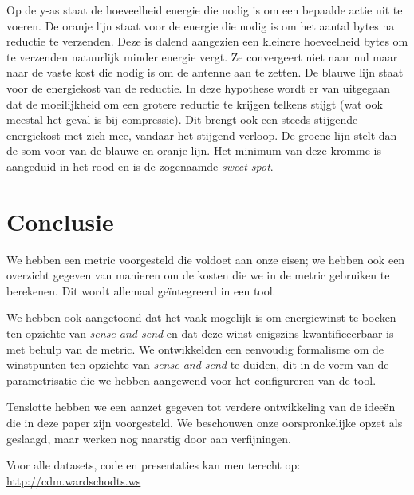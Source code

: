 \documentclass[11pt]{article}
\begin{document}
Op de y-as staat de hoeveelheid energie die nodig is om een bepaalde actie uit te voeren.
De oranje lijn staat voor de energie die nodig is om het aantal bytes na reductie te verzenden. Deze is dalend aangezien een kleinere hoeveelheid bytes om te verzenden natuurlijk minder energie vergt. Ze convergeert niet naar nul maar naar de vaste kost die nodig is om de antenne aan te zetten.
De blauwe lijn staat voor de energiekost van de reductie. In deze hypothese wordt er van uitgegaan dat de moeilijkheid om een grotere reductie te krijgen telkens stijgt (wat ook meestal het geval is bij compressie). Dit brengt ook een steeds stijgende energiekost met zich mee, vandaar het stijgend verloop.
De groene lijn stelt dan de som voor van de blauwe en oranje lijn. Het minimum van deze kromme is aangeduid in het rood en is de zogenaamde \textit{sweet spot}. 

\section{Conclusie}

We hebben een metric voorgesteld die voldoet aan onze eisen; we hebben ook een
overzicht gegeven van manieren om de kosten die we in de metric gebruiken te
berekenen. Dit wordt allemaal ge\"integreerd in een tool.

We hebben ook aangetoond dat het vaak mogelijk is om energiewinst te boeken ten
opzichte van \textit{sense and send} en dat deze winst enigszins
kwantificeerbaar is met behulp van de metric. We ontwikkelden een eenvoudig
formalisme om de winstpunten ten opzichte van \textit{sense and send} te duiden,
dit in de vorm van de parametrisatie die we hebben aangewend voor het
configureren van de tool.

Tenslotte hebben we een aanzet gegeven tot verdere ontwikkeling van de idee\"en
die in deze paper zijn voorgesteld. We beschouwen onze oorspronkelijke opzet als
geslaagd, maar werken nog naarstig door aan verfijningen.

Voor alle datasets, code en presentaties kan men terecht op: \url{http://cdm.wardschodts.ws}


\nocite{*}

\end{document}
